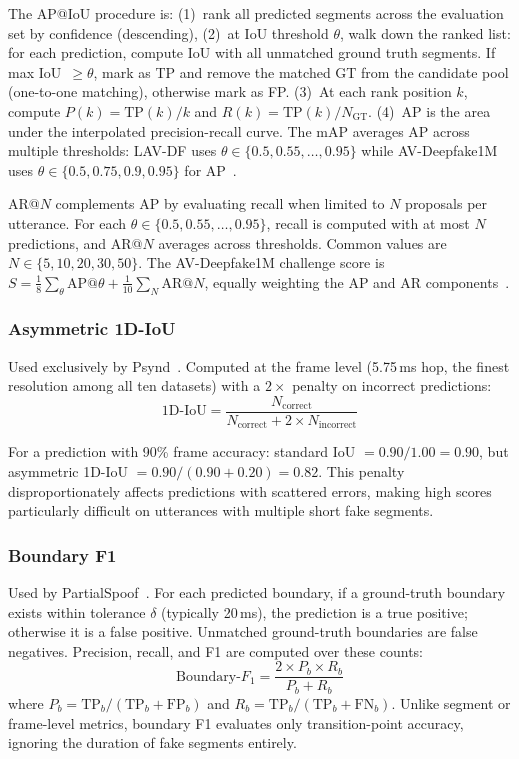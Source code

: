 \documentclass[journal]{IEEEtran}
\begin{document}
The AP@IoU procedure is: (1)~rank all predicted segments across the evaluation set by confidence (descending), (2)~at IoU threshold $\theta$, walk down the ranked list: for each prediction, compute IoU with all unmatched ground truth segments. If max IoU~$\geq \theta$, mark as TP and remove the matched GT from the candidate pool (one-to-one matching), otherwise mark as FP. (3)~At each rank position $k$, compute $P(k) = \text{TP}(k)/k$ and $R(k) = \text{TP}(k)/N_\text{GT}$. (4)~AP is the area under the interpolated precision-recall curve. The mAP averages AP across multiple thresholds: LAV-DF uses $\theta \in \{0.5, 0.55, \ldots, 0.95\}$ while AV-Deepfake1M uses $\theta \in \{0.5, 0.75, 0.9, 0.95\}$ for AP~\cite{cai2024avdeepfake1m}.

AR@$N$ complements AP by evaluating recall when limited to $N$ proposals per utterance. For each $\theta \in \{0.5, 0.55, \ldots, 0.95\}$, recall is computed with at most $N$ predictions, and AR@$N$ averages across thresholds. Common values are $N \in \{5, 10, 20, 30, 50\}$. The AV-Deepfake1M challenge score is $S = \tfrac{1}{8}\sum_\theta \text{AP@}\theta + \tfrac{1}{10}\sum_N \text{AR@}N$, equally weighting the AP and AR components~\cite{cai2024avdeepfake1m}.

\subsubsection{Asymmetric 1D-IoU}

Used exclusively by Psynd~\cite{zhang2022localizing}. Computed at the frame level (5.75\,ms hop, the finest resolution among all ten datasets) with a $2\times$ penalty on incorrect predictions:
\begin{equation}
\label{eq:asym_iou}
\text{1D-IoU} = \frac{N_\text{correct}}{N_\text{correct} + 2 \times N_\text{incorrect}}
\end{equation}

For a prediction with 90\% frame accuracy: standard IoU $= 0.90/1.00 = 0.90$, but asymmetric 1D-IoU $= 0.90/(0.90 + 0.20) = 0.82$. This penalty disproportionately affects predictions with scattered errors, making high scores particularly difficult on utterances with multiple short fake segments.

\subsubsection{Boundary F1}

Used by PartialSpoof~\cite{zhang2023partialspoof}. For each predicted boundary, if a ground-truth boundary exists within tolerance $\delta$ (typically 20\,ms), the prediction is a true positive; otherwise it is a false positive. Unmatched ground-truth boundaries are false negatives. Precision, recall, and F1 are computed over these counts:
\begin{equation}
\label{eq:boundary_f1}
\text{Boundary-}F_1 = \frac{2 \times P_b \times R_b}{P_b + R_b}
\end{equation}
where $P_b = \text{TP}_b / (\text{TP}_b + \text{FP}_b)$ and $R_b = \text{TP}_b / (\text{TP}_b + \text{FN}_b)$. Unlike segment or frame-level metrics, boundary F1 evaluates only transition-point accuracy, ignoring the duration of fake segments entirely.
\end{document}
